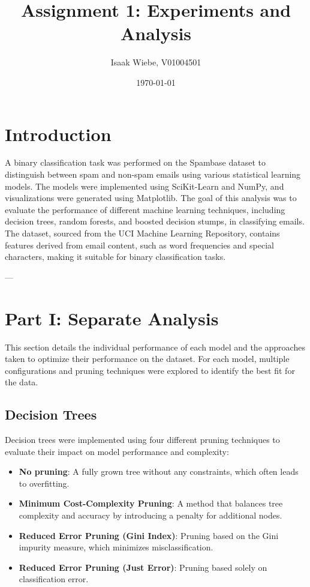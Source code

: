\documentclass[12pt]{article}
\title{Assignment 1: Experiments and Analysis}
\author{Isaak Wiebe, V01004501}
\date{\today}
\begin{document}
\maketitle
\tableofcontents
\newpage

\section{Introduction}
A binary classification task was performed on the Spambase dataset to distinguish between spam and non-spam emails using various statistical learning models. The models were implemented using SciKit-Learn and NumPy, and visualizations were generated using Matplotlib. The goal of this analysis was to evaluate the performance of different machine learning techniques, including decision trees, random forests, and boosted decision stumps, in classifying emails. The dataset, sourced from the UCI Machine Learning Repository, contains features derived from email content, such as word frequencies and special characters, making it suitable for binary classification tasks.

---

\section{Part I: Separate Analysis}
This section details the individual performance of each model and the approaches taken to optimize their performance on the dataset. For each model, multiple configurations and pruning techniques were explored to identify the best fit for the data.

\subsection{Decision Trees}
Decision trees were implemented using four different pruning techniques to evaluate their impact on model performance and complexity:
\begin{itemize}
    \item \textbf{No pruning}: A fully grown tree without any constraints, which often leads to overfitting.
    \item \textbf{Minimum Cost-Complexity Pruning}: A method that balances tree complexity and accuracy by introducing a penalty for additional nodes.
    \item \textbf{Reduced Error Pruning (Gini Index)}: Pruning based on the Gini impurity measure, which minimizes misclassification.
    \item \textbf{Reduced Error Pruning (Just Error)}: Pruning based solely on classification error.
\end{itemize}
\end{document}
